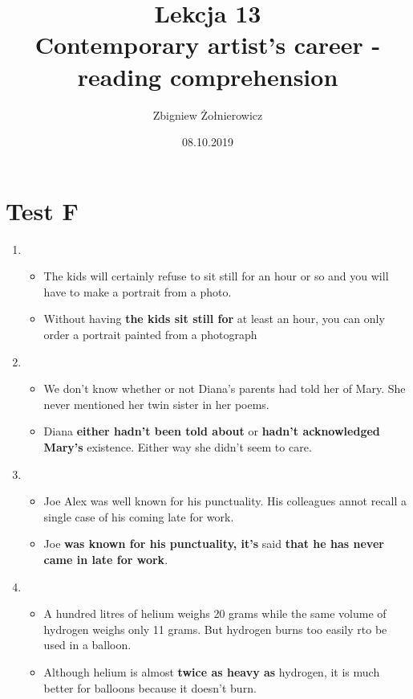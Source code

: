 \documentclass[a4paper]{article}
\begin{document}
\title{{\huge Lekcja 13} \\
{\large Contemporary artist's career - reading comprehension}}
\author{Zbigniew Żołnierowicz}
\date{08.10.2019}
\maketitle
\section*{Test F}
\begin{enumerate}
    \item \begin{itemize}
        \item The kids will certainly refuse to sit still for an hour or so and you will have to make a portrait from a photo.
        \item Without having {\bf the kids sit still for} at least an hour, you can only order a portrait painted from a photograph
    \end{itemize}
    \item \begin{itemize}
        \item We don't know whether or not Diana's parents had told her of Mary. She never mentioned her twin sister in her poems.
        \item Diana {\bf either hadn't been told about} or {\bf hadn't acknowledged Mary's} existence. Either way she didn't seem to care.
    \end{itemize}
    \item \begin{itemize}
        \item Joe Alex was well known for his punctuality. His colleagues annot recall a single case of his coming late for work.
        \item Joe {\bf was known for his punctuality, it's} said {\bf that he has never came in late for work}.
    \end{itemize}
    \item \begin{itemize}
        \item A hundred litres of helium weighs 20 grams while the same volume of hydrogen weighs only 11 grams. But hydrogen burns too easily rto be used in a balloon.
        \item Although helium is almost {\bf twice as heavy as} hydrogen, it is much better for balloons because it doesn't burn.
    \end{itemize}

\end{enumerate}
\end{document}
